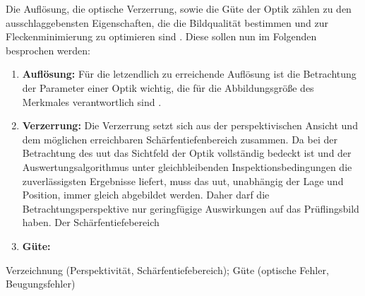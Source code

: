         Die Auflösung, die optische Verzerrung, sowie die Güte der Optik zählen zu den ausschlaggebensten Eigenschaften, die die Bildqualität bestimmen und zur Fleckenminimierung zu optimieren sind \cite{berger_test-_2012}. 
        Diese sollen nun im Folgenden besprochen werden: 

        \begin{enumerate}
            \item \textbf{Auflösung:} Für die letzendlich zu erreichende Auflösung ist die Betrachtung der Parameter einer Optik wichtig, die für die Abbildungsgröße des Merkmales verantwortlich sind \cite{berger_test-_2012}.
            \item \textbf{Verzerrung:} Die Verzerrung setzt sich aus der perspektivischen Ansicht und dem möglichen erreichbaren Schärfentiefenbereich zusammen. Da bei der Betrachtung des \ac{uut} das Sichtfeld der Optik vollständig bedeckt ist und der Auswertungsalgorithmus unter gleichbleibenden Inspektionsbedingungen die zuverlässigsten Ergebnisse liefert, muss das \ac{uut}, unabhängig der Lage und Position, immer gleich abgebildet werden. Daher darf die Betrachtungsperspektive nur geringfügige Auswirkungen auf das Prüflingsbild haben. Der Schärfentiefebereich
            \item \textbf{Güte:}
        \end{enumerate} 

        Verzeichnung (Perspektivität, Schärfentiefebereich); Güte (optische Fehler, Beugungsfehler)
        \cite{berger_test-_2012}

